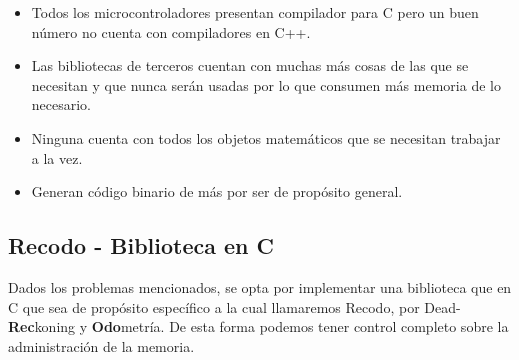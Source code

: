 \documentclass[main.tex]{subfiles}
\begin{document}
\begin{itemize}
\item Todos los microcontroladores presentan compilador para C
      pero un buen número no cuenta con compiladores en C++.
\item Las bibliotecas de terceros cuentan con muchas más cosas
      de las que se necesitan y que nunca serán usadas por lo
      que consumen más memoria de lo necesario.
\item Ninguna cuenta con todos los objetos matemáticos que se
      necesitan trabajar a la vez.
\item Generan código binario de más por ser de propósito general.
\end{itemize}

\subsection{Recodo - Biblioteca en C}
Dados los problemas mencionados, se opta por implementar una
biblioteca que en C que sea de propósito específico a la cual
llamaremos Recodo, por Dead-\textbf{Rec}koning y
\textbf{Odo}metría. De esta forma podemos tener control
completo sobre la administración de la memoria.

\hfill



%
%

\end{document}
